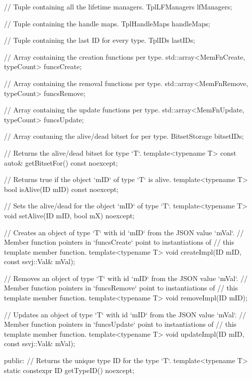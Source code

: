 \documentclass{report}
\begin{document}
{{            // Tuple containing all the lifetime managers.
            TplLFManagers lfManagers;

            // Tuple containing the handle maps.
            TplHandleMaps handleMaps;

            // Tuple containing the last ID for every type.
            TplIDs lastIDs;

            // Array containing the creation functions per type.
            std::array<MemFnCreate, typeCount> funcsCreate;

            // Array containing the removal functions per type.
            std::array<MemFnRemove, typeCount> funcsRemove;

            // Array containing the update functions per type.
            std::array<MemFnUpdate, typeCount> funcsUpdate;

            // Array contaning the alive/dead bitset for per type.
            BitsetStorage bitsetIDs;

            // Returns the alive/dead bitset for type `T`.
            template<typename T> const auto& getBitsetFor() const noexcept;

            // Returns true if the object `mID` of type `T` is alive.
            template<typename T> bool isAlive(ID mID) const noexcept;

            // Sets the alive/dead for the object `mID` of type `T`.
            template<typename T> void setAlive(ID mID, bool mX) noexcept;

            // Creates an object of type `T` with id `mID` from the JSON value `mVal`.
            // Member function pointers in `funcsCreate` point to instantiations of
            // this template member function.
            template<typename T> void createImpl(ID mID, const ssvj::Val& mVal);

            // Removes an object of type `T` with id `mID` from the JSON value `mVal`.
            // Member function pointers in `funcsRemove` point to instantiations of
            // this template member function.
            template<typename T> void removeImpl(ID mID);
            
            // Updates an object of type `T` with id `mID` from the JSON value `mVal`.
            // Member function pointers in `funcsUpdate` point to instantiations of
            // this template member function.
            template<typename T> void updateImpl(ID mID, const ssvj::Val& mVal);

        public:
            // Returns the unique type ID for the type `T`.
            template<typename T> static constexpr ID getTypeID() noexcept;

}}
\end{document}
